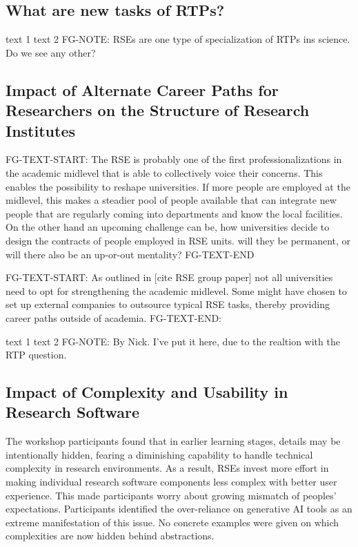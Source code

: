 \documentclass{eceasst}
\begin{document}
\subsection{What are new tasks of RTPs?}
\begin{story}{text 1 }{text 2}
 FG-NOTE: RSEs are one type of specialization of RTPs ins science. Do we see any other?
\end{story}

\subsection{Impact of Alternate Career Paths for Researchers on the Structure of Research Institutes}
FG-TEXT-START: The RSE is probably one of the first professionalizations in the academic midlevel that is able
to collectively voice their concerns. This enables the possibility to reshape universities.
If more people are employed at the midlevel, this makes a steadier pool of people
available that can integrate new people that are regularly coming into departments and know the local facilities.
On the other hand an upcoming challenge can be, how universities decide to design the contracts of people employed
in RSE units. will they be permanent, or will there also be an up-or-out mentality?
FG-TEXT-END

FG-TEXT-START:
As outlined in [cite RSE group paper] not all universities need to opt for strengthening
the academic midlevel. Some might have chosen to set up external companies to outsource typical RSE tasks,
thereby providing career paths outside of academia.
FG-TEXT-END:

\begin{story}{text 1 }{text 2}
FG-NOTE: By Nick. I've put it here, due to the realtion with the RTP question.
\end{story}

\subsection{Impact of Complexity and Usability in Research Software}

The workshop participants found that in earlier learning stages,
details may be intentionally hidden,
fearing a diminishing capability to handle technical complexity in research environments.
As a result, RSEs invest more effort in making individual research software components
less complex with better user experience.
This made participants worry about growing mismatch of peoples' expectations.
Participants identified the over-reliance on generative AI tools as an extreme manifestation of this issue.
No concrete examples were given on which complexities are now hidden behind abstractions.
\end{document}
